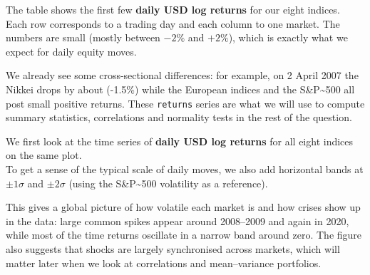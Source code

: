 \documentclass[11pt]{article}
\begin{document}
    The table shows the first few \textbf{daily USD log returns} for our
eight indices.\\
Each row corresponds to a trading day and each column to one market. The
numbers are small (mostly between \(-2\%\) and \(+2\%\)), which is
exactly what we expect for daily equity moves.

We already see some cross-sectional differences: for example, on 2 April
2007 the Nikkei drops by about (-1.5\%) while the European indices and
the S\&P\textasciitilde500 all post small positive returns. These
\texttt{returns} series are what we will use to compute summary
statistics, correlations and normality tests in the rest of the
question.

    We first look at the time series of \textbf{daily USD log returns} for
all eight indices on the same plot.\\
To get a sense of the typical scale of daily moves, we also add
horizontal bands at \(\pm 1\sigma\) and \(\pm 2\sigma\) (using the
S\&P\textasciitilde500 volatility as a reference).

This gives a global picture of how volatile each market is and how
crises show up in the data: large common spikes appear around 2008--2009
and again in 2020, while most of the time returns oscillate in a narrow
band around zero. The figure also suggests that shocks are largely
synchronised across markets, which will matter later when we look at
correlations and mean--variance portfolios.
\end{document}

